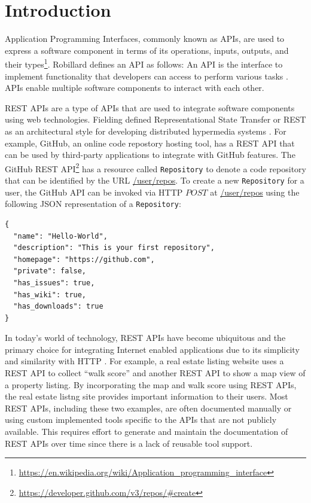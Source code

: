 \chapter{Introduction}
Application Programming Interfaces, commonly known as APIs, are used to express a software component in terms of its operations, inputs, outputs, and their types\footnote{\url{https://en.wikipedia.org/wiki/Application_programming_interface}}. Robillard defines an API as follows: An API is the interface to implement functionality that developers can access to perform various tasks \cite{Robillard_a_field_study, Robillard_what_makes}. APIs enable multiple software components to interact with each other.

REST APIs are a type of APIs that are used to integrate software components using web technologies. Fielding defined Representational State Transfer or REST as an architectural style for developing distributed hypermedia systems \cite{Fielding_rest}. For example, GitHub, an online code repostory hosting tool, has a REST API that can be used by third-party applications to integrate with GitHub features. The GitHub REST API\footnote{\url{https://developer.github.com/v3/repos/\#create}} has a resource called \texttt{Repository} to denote a code repository that can be identified by the URL \url{/user/repos}. To create a new \texttt{Repository} for a user, the GitHub API can be invoked via HTTP $POST$ at \url{/user/repos} using the following JSON representation of a \texttt{Repository}:

\begin{verbatim}
{
  "name": "Hello-World",
  "description": "This is your first repository",
  "homepage": "https://github.com",
  "private": false,
  "has_issues": true,
  "has_wiki": true,
  "has_downloads": true
}
\end{verbatim}

In today's world of technology, REST APIs have become ubiquitous and the primary choice for integrating Internet enabled applications due to its simplicity and similarity with HTTP \cite{mangler2010origin}. For example, a real estate listing website uses a REST API to collect ``walk score'' and another REST API to show a map view of a property listing. By incorporating the map and walk score using REST APIs, the real estate listng site provides important information to their users. Most REST APIs, including these two examples, are often documented manually or using custom implemented tools specific to the APIs that are not publicly available. This requires effort to generate and maintain the documentation of REST APIs over time since there is a lack of reusable tool support.


